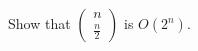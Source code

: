 \documentclass[12pt]{article}
\begin{document}
Show that $\left(\begin{array}{c}n\\\frac{n}{2}\end{array}\right)$ is $O\left(2^n\right)$.
\end{document}
